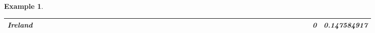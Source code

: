 \documentclass[a4paper,11pt]{report}
\newtheorem{example}[theorem]{Example}
\begin{document}
\begin{example}
\begin{appendices}
\begin{landscape}
\begin{longtable}{r|r|r|r|r|r|r|r|r|r|r|r|r|r|r|r|r|r|r|r|r|r|r|r|r|r|r|r|r|r|r|r|r|r|r|r|r|r|r|r|r|r|}
\multicolumn{1}{|r|}{\textbf{Ireland}}         &                                       &                                       &                                       &                                          &                                       &                                       &                                       &                                       &                                                &                                       &                                      &                                       &                                       &                                      &                                       &                                       &                                       &                                      &                                     &                                      &                                         &                                     &                                       &                                          &                                      &                                      &                                        &                                       &                                      &                                          &                                        &                                     &                                      &                                           &                                               &                                       &                                              &                                      &                                     & 0                                             & 0.147584917                             \\ \hline

\end{longtable}
\end{landscape}
\end{appendices}
\end{example}
\end{document}
